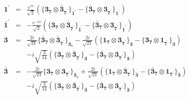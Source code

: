 \documentclass[english]{article}
\newcommand{\subcg}[3]{\big\{ {#1}\otimes{#2}\big\}^{}_{#3}}
\newcommand{\rep}[1]{\mathbf{#1}}
\begin{document}
\begin{itemize}
\begin{eqnarray*}
\rep{1^{\prime}} &=& \frac{e^{i \alpha }}{\sqrt{2}}\left(\subcg{\rep{3}_{\rep{7}}}{\rep{\bar{3}}_{\rep{7^{\prime}}}}{\rep{1^{\prime}}}-\subcg{\rep{\bar{3}}_{\rep{7}}}{\rep{3}_{\rep{7^{\prime}}}}{\rep{1^{\prime}}}\right)
\\
\rep{\bar{1}^{\prime}} &=& -\frac{e^{-i \alpha }}{\sqrt{2}}\left(\subcg{\rep{3}_{\rep{7}}}{\rep{\bar{3}}_{\rep{7^{\prime}}}}{\rep{\bar{1}^{\prime}}}-\subcg{\rep{\bar{3}}_{\rep{7}}}{\rep{3}_{\rep{7^{\prime}}}}{\rep{\bar{1}^{\prime}}}\right)
\\
\rep{3} &=& \frac{2 i}{\sqrt{21}}\subcg{\rep{\bar{3}}_{\rep{7}}}{\rep{\bar{3}}_{\rep{7^{\prime}}}}{\rep{3}_{a}}-\frac{2 i}{\sqrt{21}}\left(\subcg{\rep{1}_{\rep{7}}}{\rep{3}_{\rep{7^{\prime}}}}{\rep{3}}-\subcg{\rep{3}_{\rep{7}}}{\rep{1}_{\rep{7^{\prime}}}}{\rep{3}}\right) \\ 
 & & -i \sqrt{\frac{3}{14}}\left(\subcg{\rep{3}_{\rep{7}}}{\rep{\bar{3}}_{\rep{7^{\prime}}}}{\rep{3}}-\subcg{\rep{\bar{3}}_{\rep{7}}}{\rep{3}_{\rep{7^{\prime}}}}{\rep{3}}\right)
\\
\rep{\bar{3}} &=& -\frac{2 i}{\sqrt{21}}\subcg{\rep{3}_{\rep{7}}}{\rep{3}_{\rep{7^{\prime}}}}{\rep{\bar{3}}_{a}}+\frac{2 i}{\sqrt{21}}\left(\subcg{\rep{1}_{\rep{7}}}{\rep{\bar{3}}_{\rep{7^{\prime}}}}{\rep{\bar{3}}}-\subcg{\rep{\bar{3}}_{\rep{7}}}{\rep{1}_{\rep{7^{\prime}}}}{\rep{\bar{3}}}\right) \\ 
 & & -i \sqrt{\frac{3}{14}}\left(\subcg{\rep{3}_{\rep{7}}}{\rep{\bar{3}}_{\rep{7^{\prime}}}}{\rep{\bar{3}}}-\subcg{\rep{\bar{3}}_{\rep{7}}}{\rep{3}_{\rep{7^{\prime}}}}{\rep{\bar{3}}}\right)
\end{eqnarray*}
\end{itemize}
\end{document}
